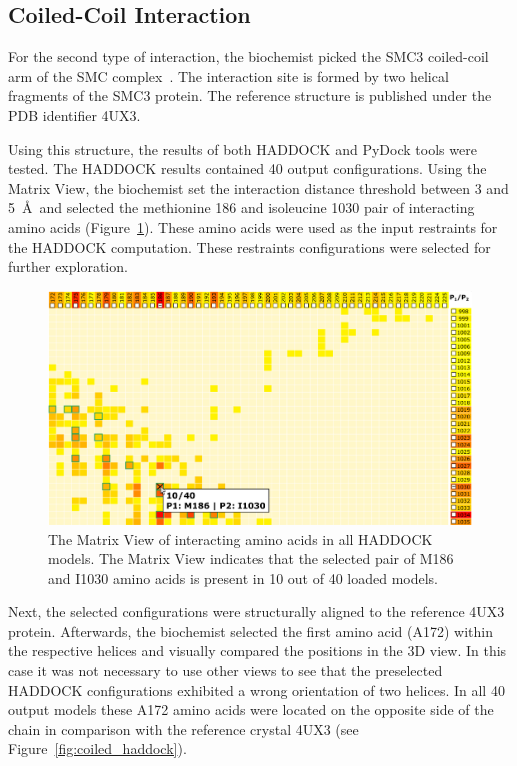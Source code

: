 \documentclass[twocolumn]{bmcart}%
\def\MatView {Matrix View\xspace}
\begin{document}
\subsection{Coiled-Coil Interaction}
For the second type of interaction, the biochemist picked the SMC3 coiled-coil arm of the SMC complex~\cite{Gligoris}.
The interaction site is formed by two helical fragments of the SMC3 protein.
The reference structure is published under the PDB identifier 4UX3.  

Using this structure, the results of both HADDOCK and PyDock tools were tested.
The HADDOCK results contained 40 output configurations.
Using the \MatView, the biochemist set the interaction distance threshold between 3 and 5~\AA~and selected the methionine 186 and isoleucine 1030 pair of interacting amino acids (Figure~\ref{fig:coiled_haddock_mat}). 
These amino acids were used as the input restraints for the HADDOCK computation.
These restraints configurations were selected for further exploration.

\begin{figure}[tb]
  \centering
  \includegraphics[width=0.95\columnwidth]{images/figure10.pdf}
  \vspace{-15pt}
  \caption{The \MatView of interacting amino acids in all HADDOCK models. The \MatView indicates that the selected pair of M186 and I1030 amino acids is present in 10 out of 40 loaded models.}
  \label{fig:coiled_haddock_mat}
\end{figure}

Next, the selected configurations were structurally aligned to the reference 4UX3 protein.
Afterwards, the biochemist selected the first amino acid (A172) within the respective helices and visually compared the positions in the 3D view.
In this case it was not necessary to use other views to see that the preselected HADDOCK configurations exhibited a wrong orientation of two helices. 
In all 40 output models these A172 amino acids were located on the opposite side of the chain in comparison with the reference crystal 4UX3 (see Figure~\ref{fig:coiled_haddock}).
\end{document}
